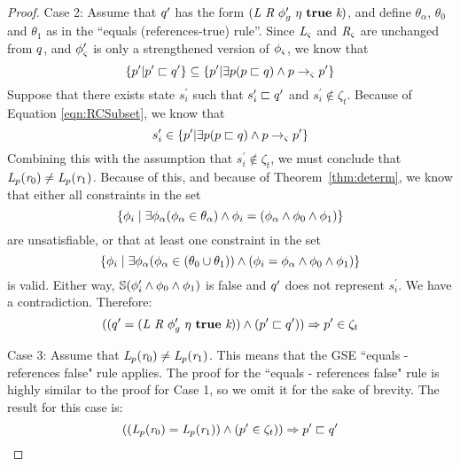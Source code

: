 \begin{proof}
Case 2:  Assume that $q^\prime$ has the form $\lp \cfgnt{L}\ \cfgnt{R}\ \phi_g^\prime\ \eta\ \cfgt{true}\ \cfgnt{k}\rp $, and define $\theta_\alpha$, $\theta_0$ and $\theta_1$ as in the ``equals (references-true) rule''. Since $\emph{L}_{\varsigma}$ and $\emph{R}_{\varsigma}$ are unchanged from $q$, and $\phi_{\varsigma}^\prime$ is only a strengthened version of $\phi_{\varsigma}$,  we know that
\begin{equation}
\label{eqn:RCSubset}
\{p^\prime | p^\prime \sqsubset q^\prime \} \subseteq \{p^\prime | \exists p ( p \sqsubset q ) \wedge p \rightarrow_{\varsigma} p^\prime\}
\end{equation}
Suppose that there exists state $s_i^\prime$ such that $s_i^\prime \sqsubset q^\prime$ and $s_i^\prime \notin \zeta_t$. Because of Equation \ref{eqn:RCSubset}, we know that 
$$s_i^\prime \in \{p^\prime | \exists p ( p \sqsubset q) \wedge p \rightarrow_{\varsigma} p^\prime\}$$ 
Combining this with the assumption that $s_i^\prime \notin \zeta_t$, we must conclude that $\emph{L}_{p} ( \emph{r}_0) \neq  \emph{L}_{p} ( \emph{r}_1 )$. Because of this, and because of Theorem~\ref{thm:determ}, we know that either all constraints in the set
$$\{\phi_i \mid \exists \phi_\alpha (\phi_\alpha \in \theta_\alpha)\wedge \phi_i = (\phi_\alpha \wedge \phi_0 \wedge \phi_1)\}$$ are unsatisfiable, or that at least one constraint in the set
$$\{\phi_i \mid \exists \phi_\alpha (\phi_\alpha \in ( \theta_0 \cup \theta_1 ))\wedge ( \phi_i = \phi_\alpha \wedge \phi_0 \wedge \phi_1 )\}$$ 
is valid. Either way, $\mathbb{S}(\phi_i^\prime \wedge\phi_0\wedge \phi_1)$ is false and $q^\prime$ does not represent $s_i^\prime$. We have a contradiction. Therefore: 
\begin{equation}
\label{eqn:RCBackwardsTrue}
((\symst^\prime=\lp \cfgnt{L}\ \cfgnt{R}\ \phi_g^\prime\ \eta\ \cfgt{true}\ \cfgnt{k}\rp) \wedge (\gsest^\prime \sqsubset \symst^\prime)) \Rightarrow \gsest^\prime \in \zeta_t
\end{equation}

Case 3: Assume that $\emph{L}_{p} ( \emph{r}_0) \neq \emph{L}_{p} ( \emph{r}_1 )$.
This means that the GSE ``equals - references false" rule applies. The proof for the ``equals - references false" rule is highly similar to the proof for Case 1, so we omit it for the sake of brevity. The result for this case is:
\begin{equation}
\label{eqn:RCForwardsFalse}
((\emph{L}_{p} ( \emph{r}_0) = \emph{L}_{p} ( \emph{r}_1 )) \wedge (p^\prime \in \zeta_t)) \Rightarrow p^\prime \sqsubset q^\prime
\end{equation}


\end{proof}
